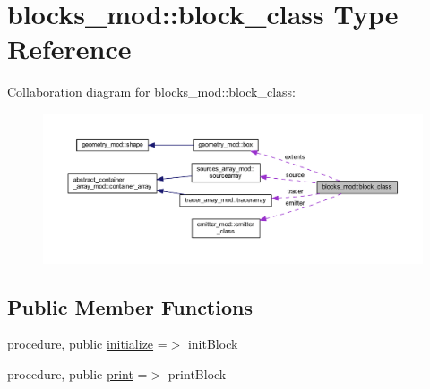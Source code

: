\hypertarget{structblocks__mod_1_1block__class}{}\section{blocks\+\_\+mod\+:\+:block\+\_\+class Type Reference}
\label{structblocks__mod_1_1block__class}


Collaboration diagram for blocks\+\_\+mod\+:\+:block\+\_\+class\+:
\nopagebreak
\begin{figure}[H]
\begin{center}
\leavevmode
\includegraphics[width=350pt]{structblocks__mod_1_1block__class__coll__graph}
\end{center}
\end{figure}
\subsection*{Public Member Functions}
\begin{DoxyCompactItemize}
\item 
procedure, public \hyperlink{structblocks__mod_1_1block__class_ad671745ca5dc3227ddb0ed1d9ff45268}{initialize} =$>$ init\+Block
\item 
procedure, public \hyperlink{structblocks__mod_1_1block__class_a43b4c133934eaadb55d30cf834d1e28c}{print} =$>$ print\+Block
\end{DoxyCompactItemize}
